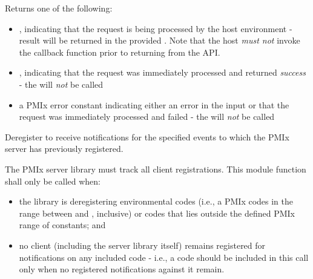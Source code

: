 \begin{arglist}
\end{arglist}

Returns one of the following:

\begin{itemize}
    \item {}, indicating that the request is being processed by the host environment - result will be returned in the provided . Note that the host \emph{must not} invoke the callback function prior to returning from the \ac{API}.
    \item {}, indicating that the request was immediately processed and returned \textit{success} - the  will \textit{not} be called
    \item a PMIx error constant indicating either an error in the input or that the request was immediately processed and failed - the  will \textit{not} be called
\end{itemize}

\descr

Deregister to receive notifications for the specified events to which the \ac{PMIx} server has previously registered.

\adviceimplstart
The \ac{PMIx} server library must track all client registrations. This module function shall only be called when:

\begin{itemize}
    \item the library is deregistering environmental codes (i.e., a \ac{PMIx} codes in the range between  and , inclusive) or codes that lies outside the defined \ac{PMIx} range of constants; and
    \item no client (including the server library itself) remains registered for notifications on any included code - i.e., a code should be included in this call only when no registered notifications against it remain.
\end{itemize}

\adviceimplend


\subsection{}

